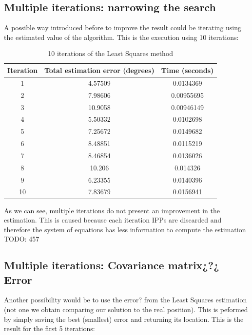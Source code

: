 \subsection{Multiple iterations: narrowing the search}

A possible way introduced before to improve the result could be iterating using the estimated value of the algorithm. This is the execution using 10 iterations:

\begin{table}[h!]
	\centering
	\def\arraystretch{1.2}
	\begin{tabular}{|c c c|} 
		\hline
		Iteration & Total estimation error (degrees) & Time (seconds) \\ [0.5ex] 
		\hline\hline
		1  & 4.57509 & 0.0134369 \\
		\hline
		2  & 7.98606 & 0.00955695 \\
		\hline
		3  & 10.9058 & 0.00946149 \\
		\hline
		4  & 5.50332 & 0.0102698 \\
		\hline
		5  & 7.25672 & 0.0149682 \\
		\hline
		6  & 8.48851 & 0.0115219 \\
		\hline
		7  & 8.46854 & 0.0136026 \\
		\hline
		8  & 10.206 & 0.014326 \\
		\hline
		9  & 6.23355 & 0.0140396 \\
		\hline
		10  & 7.83679 & 0.0156941 \\
		\hline
	\end{tabular}
	\caption{10 iterations of the Least Squares method}
\end{table}

As we can see, multiple iterations do not present an improvement in the estimation. This is caused because each iteration IPPs are discarded and therefore the system of equations has less information to compute the estimation TODO: 457

\subsection{Multiple iterations: Covariance matrix¿?¿ Error}

Another possibility would be to use the error? from the Least Squares estimation (not one we obtain comparing our solution to the real position). This is peformed by simply saving the best (smallest) error and returning its location. This is the result for the first 5 iterations:

